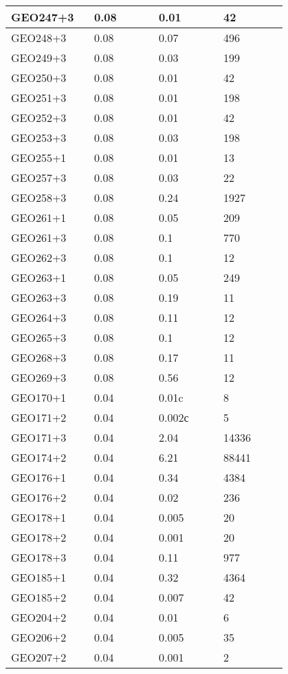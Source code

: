 \begin{longtable}[H]{|p{0.2\linewidth}|p{0.2\linewidth}|p{0.2\linewidth}|p{0.2\linewidth}|}
\hline
GEO247+3 & 0.08 & 0.01 & 42 \\
\hline
GEO248+3 & 0.08 & 0.07 & 496 \\
\hline
GEO249+3 & 0.08 & 0.03 & 199 \\
\hline
GEO250+3 & 0.08 & 0.01 & 42 \\
\hline
GEO251+3 & 0.08 & 0.01 & 198 \\
\hline
GEO252+3 & 0.08 & 0.01 & 42 \\
\hline
GEO253+3 & 0.08 & 0.03 & 198 \\
\hline
GEO255+1 & 0.08 & 0.01 & 13 \\
\hline
GEO257+3 & 0.08 & 0.03 &  22 \\
\hline
GEO258+3 & 0.08 & 0.24 &  1927 \\
\hline
GEO261+1 & 0.08 & 0.05 &  209 \\
\hline
GEO261+3 & 0.08 &  0.1 &  770 \\
\hline
GEO262+3 & 0.08 &  0.1 & 12 \\
\hline
GEO263+1 & 0.08 & 0.05 &  249 \\
\hline
GEO263+3 & 0.08 & 0.19 &  11 \\
\hline
GEO264+3 & 0.08 & 0.11 &  12 \\
\hline
GEO265+3 & 0.08 &  0.1 &  12 \\
\hline
GEO268+3 & 0.08 & 0.17 &  11 \\
\hline
GEO269+3 & 0.08 & 0.56 & 12 \\
\hline
GEO170+1 &  0.04 &  0.01c &  8 \\
\hline
GEO171+2 &  0.04 &  0.002с &  5 \\
\hline
GEO171+3 &  0.04 &  2.04 &  14336 \\
\hline
GEO174+2 &  0.04 &  6.21 &  88441 \\
\hline
GEO176+1 &  0.04 &  0.34 &  4384 \\
\hline
GEO176+2 &  0.04 &  0.02 &  236 \\
\hline
GEO178+1 &  0.04 &  0.005 &  20 \\
\hline
GEO178+2 &  0.04 &  0.001 &  20 \\
\hline
GEO178+3 &  0.04 &  0.11 &  977 \\
\hline
GEO185+1 &  0.04 &  0.32 &  4364 \\
\hline
GEO185+2 &  0.04 &  0.007 &  42 \\
\hline
GEO204+2 &  0.04 &  0.01 &  6 \\
\hline
GEO206+2 &  0.04 &  0.005 &  35 \\
\hline
GEO207+2 &  0.04 &  0.001 &  2 \\

\end{longtable}
